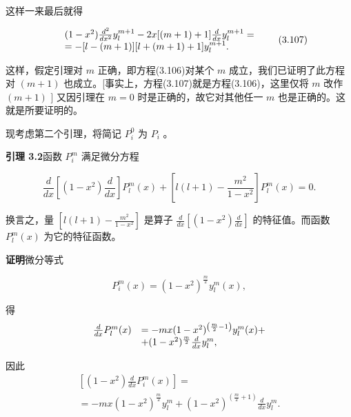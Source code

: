这样一来最后就得

\begin{equation*}
\begin{array}{r l} & (1 - x ^ {2}) \frac {d ^ {2}}{d x ^ {2}} y _ {l} ^ {m + 1} - 2 x [ (m + 1) + 1 ] \frac {d}{d x} y _ {l} ^ {m + 1} = \\ & = - [ l - (m + 1) ] [ l + (m + 1) + 1 ] y _ {l} ^ {m + 1}. \end{array} \tag{3.107}
\end{equation*}

这样，假定引理对 $m$ 正确，即方程(3.106)对某个 $m$ 成立，我们已证明了此方程对 $(m + 1)$ 也成立。[事实上，方程(3.107)就是方程(3.106)，这里仅将 $m$ 改作 $(m + 1)$ ] 又因引理在 $m = 0$ 时是正确的，故它对其他任一 $m$ 也是正确的。这就是所要证明的。

现考虑第二个引理，将简记 $P_{i}^{0}$ 为 $P_{i}$ 。

\textbf{引理 3.2}\quad 函数 $P_{i}^{m}$ 满足微分方程

\begin{equation*}
\frac {d}{d x} \left[ (1 - x ^ {2}) \frac {d}{d x} \right] P _ {l} ^ {m} (x) + \left[ l (l + 1) - \frac {m ^ {2}}{1 - x ^ {2}} \right] P _ {l} ^ {m} (x) = 0.\tag{3.108}
\end{equation*}

换言之，量 $\left[l(l + 1) - \frac{m^2}{1 - x^2}\right]$ 是算子 $\frac{d}{dx}\left[(1 - x^2)\frac{d}{dx}\right]$ 的特征值。而函数 $P_{l}^{m}(x)$ 为它的特征函数。

\textbf{证明}\quad 微分等式

\begin{equation*}
P _ {i} ^ {m} (x) = \left(1 - x ^ {2}\right) ^ {\frac {m}{2}} y _ {l} ^ {m} (x),
\end{equation*}

得
\begin{equation*}
\begin{array}{r l} \frac {d}{d x} P _ {l} ^ {m} (x) & = - m x (1 - x ^ {2}) ^ {\left(\frac {m}{2} - 1\right)} y _ {l} ^ {m} (x) + \\ & + (1 - x ^ {2}) ^ {\frac {m}{2}} \frac {d}{d x} y _ {l} ^ {m}, \end{array}
\end{equation*}

因此
\begin{equation*}
\begin{array}{l} \left[ (1 - x ^ {2}) \frac {d}{d x} P _ {i} ^ {m} (x) \right] = \\ = - m x (1 - x ^ {2}) ^ {\frac {m}{2}} y _ {l} ^ {m} + (1 - x ^ {2}) ^ {\left(\frac {m}{2} + 1\right)} \frac {d}{d x} y _ {l} ^ {m}. \end{array}\tag{3.109}
\end{equation*}

